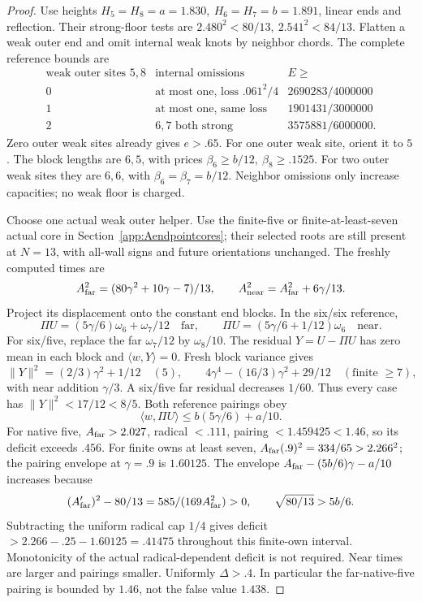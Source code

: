 \documentclass[11pt]{article}
\theoremstyle{definition}
\theoremstyle{remark}
\newcommand{\ip}[2]{\langle #1,#2\rangle}
\newcommand{\norm}[1]{\lVert #1\rVert}
\begin{document}
\begin{proof}
Use heights
\(H_5=H_8=a=1.830,\ H_6=H_7=b=1.891\),
linear ends and reflection.
Their strong-floor tests are
\(2.480^2<80/13,\ 2.541^2<84/13\).
Flatten a weak outer end and omit internal weak
knots by neighbor chords. The complete reference
bounds are
\[
\begin{array}{c|c|c}
\text{weak outer sites }5,8&
 \text{internal omissions}&E\geq\\ \hline
0&\text{at most one, loss } .061^2/4&
2690283/4000000\\
1&\text{at most one, same loss}&1901431/3000000\\
2&6,7\text{ both strong}&3575881/6000000.
\end{array}
\]
Zero outer weak sites already gives \(e>.65\).
For one outer weak site, orient it to \(5\).
The block lengths are \(6,5\), with prices
\(\beta_6\geq b/12,\ \beta_8\geq.1525\).
For two outer weak sites they are \(6,6\),
with \(\beta_6=\beta_7=b/12\).
Neighbor omissions only increase capacities;
no weak floor is charged.

Choose one actual weak outer helper.
Use the finite-five or finite-at-least-seven
actual core in Section~\ref{app:Aendpointcores};
their selected roots are still present at
\(N=13\), with all-wall signs and future
orientations unchanged.
The freshly computed times are
\[
 A_{\rm far}^2=(80\gamma^2+10\gamma-7)/13,\qquad
 A_{\rm near}^2=A_{\rm far}^2+6\gamma/13.
\]
Project its displacement onto the constant
end blocks. In the six/six reference,
\[
 \Pi U=(5\gamma/6)\omega_6+\omega_7/12
 \quad\text{far},\qquad
 \Pi U=(5\gamma/6+1/12)\omega_6
 \quad\text{near}.
\]
For six/five, replace the far \(\omega_7/12\)
by \(\omega_8/10\).
The residual \(Y=U-\Pi U\) has zero mean in
each block and \(\ip{w}{Y}=0\).
Fresh block variance gives
\[
 \norm{Y}^2=(2/3)\gamma^2+1/12\quad(5),\qquad
 4\gamma^4-(16/3)\gamma^2+29/12
                 \quad(\text{finite }\geq7),
\]
with near addition \(\gamma/3\).
A six/five far residual decreases \(1/60\).
Thus every case has \(\norm Y^2<17/12<8/5\).
Both reference pairings obey
\[
 \ip{w}{\Pi U}\leq b(5\gamma/6)+a/10.
\]
For native five, \(A_{\rm far}>2.027\),
radical \(<.111\), pairing \(<1.459425<1.46\),
so its deficit exceeds \(.456\).
For finite owns at least seven,
\(A_{\rm far}(.9)^2=334/65>2.266^2\);
the pairing envelope at \(\gamma=.9\) is \(1.60125\).
The envelope \(A_{\rm far}-(5b/6)\gamma-a/10\) increases because
\[
 (A_{\rm far}')^2-80/13=585/(169A_{\rm far}^2)>0,
 \qquad \sqrt{80/13}>5b/6.
\]
Subtracting the uniform radical cap \(1/4\) gives
deficit \(>2.266-.25-1.60125=.41475\) throughout this
finite-own interval. Monotonicity of the actual radical-dependent
deficit is not required.
Near times are larger and pairings smaller.
Uniformly \(\Delta>.4\).
In particular the far-native-five pairing is
bounded by \(1.46\), not the false value \(1.438\).


\end{proof}
\end{document}
